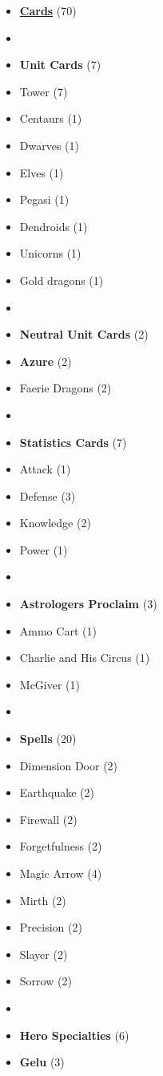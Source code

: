 \begin{multicols*}{3}
\begin{itemize}[leftmargin=0pt, label={}, noitemsep, noitemsep]
  \item \textbf{\normalsize{\underline{Cards}}} (70)
  \item
  \item \textbf{Unit Cards} (7)
  \item Tower (7)
  \item Centaurs (1)
  \item Dwarves (1)
  \item Elves (1)
  \item Pegasi (1)
  \item Dendroids (1)
  \item Unicorns (1)
  \item Gold dragons (1)
  \item
  \item \textbf{Neutral Unit Cards} (2)
  \item \textbf{Azure} (2)
  \item Faerie Dragons (2)
  \item
  \item \textbf{Statistics Cards} (7)
  \item Attack (1)
  \item Defense (3)
  \item Knowledge (2)
  \item Power (1)
  \item
  \item \textbf{Astrologers Proclaim} (3)
  \item Ammo Cart (1)
  \item Charlie and His Circus (1)
  \item McGiver (1)
  \item
  \item \textbf{Spells} (20)
  \item Dimension Door (2)
  \item Earthquake (2)
  \item Firewall (2)
  \item Forgetfulness (2)
  \item Magic Arrow (4)
  \item Mirth (2)
  \item Precision (2)
  \item Slayer (2)
  \item Sorrow (2)
  \item
  \item \textbf{Hero Specialties} (6)
  \item \textbf{Gelu} (3)

\end{itemize}
\end{multicols*}
